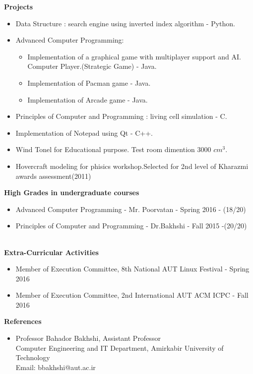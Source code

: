 \documentclass[a4paper,12pt,final]{memoir}
\newcommand{\Sep}{\vspace{1.5em}}
\newcommand{\SmallSep}{\vspace{0.5em}}
\newcommand{\CVSection}[1]
	{\Large\textbf{#1}\par
	\SmallSep\normalsize\normalfont}
\begin{document}
\CVSection{Projects}
\begin{itemize}
	\item Data Structure : search engine using inverted index algorithm - Python.
	
	\item Advanced Computer Programming:
		\begin{itemize}[$\circ$]
		\item  Implementation of a graphical game with multiplayer support and AI. Computer Player.(Strategic Game) - Java.
     	\item Implementation of Pacman game - Java.
	    \item Implementation of Arcade game - Java.
		\end{itemize}
		
	\item Principles of Computer and Programming : living cell simulation - C.
	\item Implementation of Notepad using Qt - C++.
	\item Wind Tonel for Educational purpose. Test room dimention 3000
$cm^{3}$.
	\item Hovercraft modeling for phisics workshop.Selected for 2nd level of Kharazmi awards assessment(2011)
 
\end{itemize}

\Sep

\CVSection{High Grades in undergraduate courses}
	\begin{itemize}
		\item  Advanced Computer Programming - Mr. Poorvatan - Spring 2016 - (18/20)
		\item Principles of Computer and Programming - Dr.Bakhshi - Fall 2015 -(20/20)
	\end{itemize}

\newpage
\normalsize\normalfont
\framebreak
\framebreak
\\

\CVSection{Extra-Curricular Activities}
	\begin{itemize}
		\item Member of Execution Committee, 8th National AUT Linux Festival - Spring 2016
		\item Member of Execution Committee, 2nd International AUT ACM ICPC - Fall 2016
	\end{itemize}
	
\CVSection{References}
	\begin{itemize}
		\item {Professor Bahador Bakhshi, Assistant Professor \\
Computer Engineering and IT Department, Amirkabir University of Technology\\
Email: bbakhshi@aut.ac.ir}
	\end{itemize}
\end{document}
